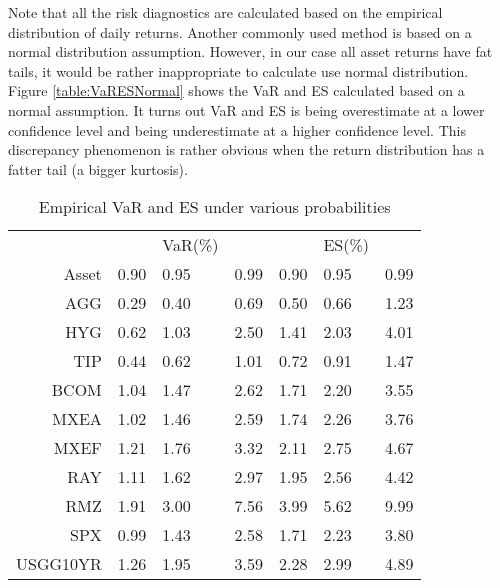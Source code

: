 Note that all the risk diagnostics are calculated based on the empirical distribution of daily returns. Another commonly used method is based on a normal distribution assumption. However, in our case all asset returns have fat tails, it would be rather inappropriate to calculate use normal distribution. Figure \ref{table:VaRESNormal} shows the VaR and ES calculated based on a normal assumption. It turns out VaR and ES is being overestimate at a lower confidence level and being underestimate at a higher confidence level. This discrepancy phenomenon is rather obvious when the return distribution has a fatter tail (a bigger kurtosis).


\begin{table}[!h]
\caption{Empirical VaR and ES under various probabilities} %
\centering 
\begin{tabular}{ | r || p{1cm} p{1cm} p{1cm} || p{1cm} p{1cm} p{1cm} | } 
 \hline
 & & VaR(\%) &&& ES(\%) & \\
Asset& 0.90 & 0.95 & 0.99 & 0.90 & 0.95 & 0.99 \\
  \hline \hline
AGG & 0.29 & 0.40 & 0.69 & 0.50 & 0.66 & 1.23\\ 
HYG & 0.62 & 1.03 & 2.50 & 1.41 & 2.03 & 4.01\\ 
TIP & 0.44 & 0.62 & 1.01 & 0.72 & 0.91 & 1.47\\ 
BCOM & 1.04 & 1.47 & 2.62 & 1.71 & 2.20 & 3.55\\ 
MXEA & 1.02 & 1.46 & 2.59 & 1.74 & 2.26 & 3.76\\ 
MXEF & 1.21 & 1.76 & 3.32 & 2.11 & 2.75 & 4.67\\ 
RAY & 1.11 & 1.62 & 2.97 & 1.95 & 2.56 & 4.42\\ 
RMZ & 1.91 & 3.00 & 7.56 & 3.99 & 5.62 & 9.99\\ 
SPX & 0.99 & 1.43 & 2.58 & 1.71 & 2.23 & 3.80\\ 
USGG10YR & 1.26 & 1.95 & 3.59 & 2.28 & 2.99 & 4.89\\
 \hline
\end{tabular}
\label{table:VaRES}
\end{table}

